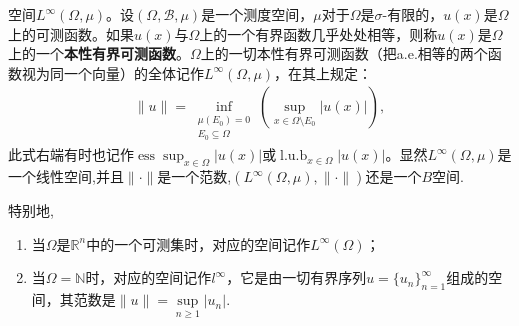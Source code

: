 \documentclass[../../main.tex]{subfiles}%
\begin{document}
\begin{proposition}
空间$L^\infty(\Omega,\mu)$。设$(\Omega,\mathscr{B},\mu)$是一个测度空间，$\mu$对于$\Omega$是$\sigma$-有限的，$u(x)$是$\Omega$上的可测函数。如果$u(x)$与$\Omega$上的一个有界函数几乎处处相等，则称$u(x)$是$\Omega$上的一个\textbf{本性有界可测函数}。$\Omega$上的一切本性有界可测函数（把a.e.相等的两个函数视为同一个向量）的全体记作$L^\infty(\Omega,\mu)$，在其上规定：
\begin{align}\label{eq:linfnorm}
\|u\|=\inf_{\substack{\mu(E_0)=0\\E_0\subseteq\Omega}}\left(\sup_{x\in\Omega\setminus E_0}|u(x)|\right),
\end{align}
此式右端有时也记作$\operatorname{ess}\sup_{x\in\Omega}|u(x)|$或$\operatorname{l.u.b}_{x\in\Omega}|u(x)|$。显然$L^\infty(\Omega,\mu)$是一个线性空间,并且$\|\cdot\|$是一个范数,$(L^\infty(\Omega,\mu),\|\cdot\|)$还是一个$B$空间.

特别地,
\begin{enumerate}[(1)]
\item 当$\Omega$是$\mathbb{R}^n$中的一个可测集时，对应的空间记作$L^\infty(\Omega)$；

\item 当$\Omega = \mathbb{N}$时，对应的空间记作$l^\infty$，它是由一切有界序列$u = \{u_n\}_{n=1}^\infty$组成的空间，其范数是$\|u\| = \sup\limits_{n\geqslant 1} |u_n|.$
\end{enumerate}
\end{proposition}
\end{document}
